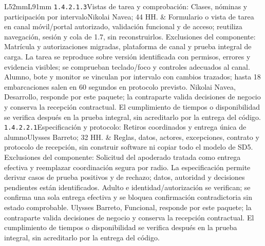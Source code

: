 \begin{longtable}{L{52mm}L{91mm}}
\texttt{1.\allowbreak{}4.\allowbreak{}2.\allowbreak{}1.\allowbreak{}3}\newline Vistas de tarea y comprobación: Clases, nóminas y participación por intervalo\newline Nikolai Navea; 44 HH. & Formulario o vista de tarea en canal móvil/portal autorizado, validación funcional y de acceso; reutiliza navegación, sesión y cola de 1.7, sin reconstruirlos. Exclusiones del componente: Matrícula y autorizaciones migradas, plataforma de canal y prueba integral de carga. La tarea se reproduce sobre versión identificada con permisos, errores y evidencia visibles; se comprueban teclado/foco y controles adecuados al canal. Alumno, bote y monitor se vinculan por intervalo con cambios trazados; hasta 18 embarcaciones salen en 60 segundos en protocolo previsto. Nikolai Navea, Desarrollo, responde por este paquete; la contraparte valida decisiones de negocio y conserva la recepción contractual. El cumplimiento de tiempos o disponibilidad se verifica después en la prueba integral, sin acreditarlo por la entrega del código.\\\hline
\texttt{1.\allowbreak{}4.\allowbreak{}2.\allowbreak{}2.\allowbreak{}1}\newline Especificación y protocolo: Retiros coordinados y entrega única de alumno\newline Ulysses Barreto; 32 HH. & Reglas, datos, actores, excepciones, contrato y protocolo de recepción, sin construir software ni copiar todo el modelo de SD5. Exclusiones del componente: Solicitud del apoderado tratada como entrega efectiva y reemplazar coordinación segura por radio. La especificación permite derivar casos de prueba positivos y de rechazo; datos, autoridad y decisiones pendientes están identificados. Adulto e identidad/autorización se verifican; se confirma una sola entrega efectiva y se bloquea confirmación contradictoria sin estado comprobable. Ulysses Barreto, Funcional, responde por este paquete; la contraparte valida decisiones de negocio y conserva la recepción contractual. El cumplimiento de tiempos o disponibilidad se verifica después en la prueba integral, sin acreditarlo por la entrega del código.\\\hline

\end{longtable}
